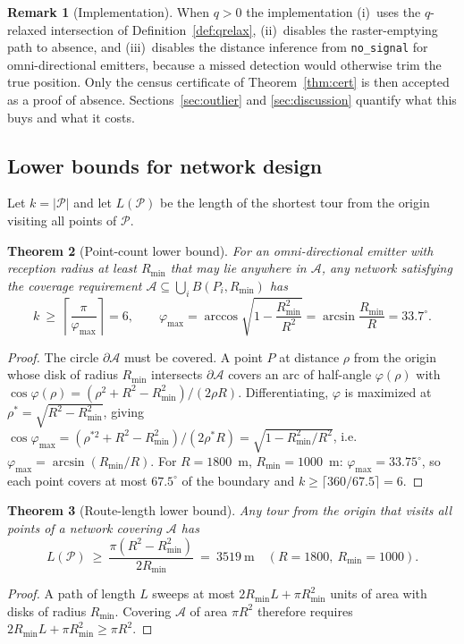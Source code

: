 \documentclass[journal,10pt]{IEEEtran}
\newtheorem{theorem}{Theorem}
\theoremstyle{definition}
\newtheorem{remark}[theorem]{Remark}
\newcommand{\Rmin}{R_{\min}}
\newcommand{\bA}{\mathcal{A}}
\newcommand{\bP}{\mathcal{P}}
\begin{document}
\begin{remark}[Implementation]
When $q>0$ the implementation (i)~uses the $q$-relaxed intersection of
Definition~\ref{def:qrelax}, (ii)~disables the raster-emptying path to absence, and
(iii)~disables the distance inference from \texttt{no\_signal} for omni-directional emitters,
because a missed detection would otherwise trim the true position. Only the census certificate of
Theorem~\ref{thm:cert} is then accepted as a proof of absence. Sections~\ref{sec:outlier} and
\ref{sec:discussion} quantify what this buys and what it costs.
\end{remark}

\subsection{Lower bounds for network design}
\label{sec:bounds}

Let $k=|\bP|$ and let $L(\bP)$ be the length of the shortest tour from the origin visiting all
points of $\bP$.

\begin{theorem}[Point-count lower bound]
\label{thm:klb}
For an omni-directional emitter with reception radius at least $\Rmin$ that may lie anywhere in
$\bA$, any network satisfying the coverage requirement $\bA\subseteq\bigcup_i B(P_i,\Rmin)$ has
\begin{equation}
k\ \ge\ \left\lceil\frac{\pi}{\varphi_{\max}}\right\rceil=6,
\qquad
\varphi_{\max}=\arccos\!\sqrt{1-\frac{\Rmin^2}{R^2}}=\arcsin\!\frac{\Rmin}{R}=33.7^\circ .
\label{eq:klb}
\end{equation}
\end{theorem}
\begin{proof}
The circle $\partial\bA$ must be covered. A point $P$ at distance $\rho$ from the origin whose
disk of radius $\Rmin$ intersects $\partial\bA$ covers an arc of half-angle $\varphi(\rho)$ with
$\cos\varphi(\rho)=(\rho^2+R^2-\Rmin^2)/(2\rho R)$. Differentiating, $\varphi$ is maximized at
$\rho^\ast=\sqrt{R^2-\Rmin^2}$, giving
$\cos\varphi_{\max}=(\rho^{\ast2}+R^2-\Rmin^2)/(2\rho^\ast R)=\sqrt{1-\Rmin^2/R^2}$, i.e.
$\varphi_{\max}=\arcsin(\Rmin/R)$. For $R=1800$~m, $\Rmin=1000$~m:
$\varphi_{\max}=33.75^\circ$, so each point covers at most $67.5^\circ$ of the boundary and
$k\ge\lceil360/67.5\rceil=6$.
\end{proof}

\begin{theorem}[Route-length lower bound]
\label{thm:llen}
Any tour from the origin that visits all points of a network covering $\bA$ has
\begin{equation}
L(\bP)\ \ge\ \frac{\pi(R^2-\Rmin^2)}{2\Rmin}\ =\ 3519\ \text{m}
\quad (R=1800,\ \Rmin=1000).
\label{eq:llen}
\end{equation}
\end{theorem}
\begin{proof}
A path of length $L$ sweeps at most $2\Rmin L+\pi\Rmin^2$ units of area with disks of radius
$\Rmin$. Covering $\bA$ of area $\pi R^2$ therefore requires
$2\Rmin L+\pi\Rmin^2\ge\pi R^2$.
\end{proof}
\end{document}
